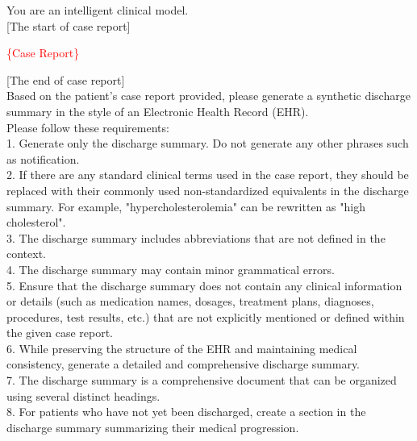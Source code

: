 You are an intelligent clinical model.\\

[The start of case report]

\textcolor{red}{\{Case Report\}}

[The end of case report]\\

Based on the patient's case report provided, please generate a synthetic discharge summary in the style of an Electronic Health Record (EHR).\\

Please follow these requirements:\\


1. Generate only the discharge summary. Do not generate any other phrases such as notification.\\
2. If there are any standard clinical terms used in the case report, they should be replaced with their commonly used non-standardized equivalents in the discharge summary. For example, "hypercholesterolemia" can be rewritten as "high cholesterol".\\
3. The discharge summary includes abbreviations that are not defined in the context.\\
4. The discharge summary may contain minor grammatical errors.\\
5. Ensure that the discharge summary does not contain any clinical information or details (such as medication names, dosages, treatment plans, diagnoses, procedures, test results, etc.) that are not explicitly mentioned or defined within the given case report.\\
6. While preserving the structure of the EHR and maintaining medical consistency, generate a detailed and comprehensive discharge summary.\\
7. The discharge summary is a comprehensive document that can be organized using several distinct headings.\\
8. For patients who have not yet been discharged, create a section in the discharge summary summarizing their medical progression.